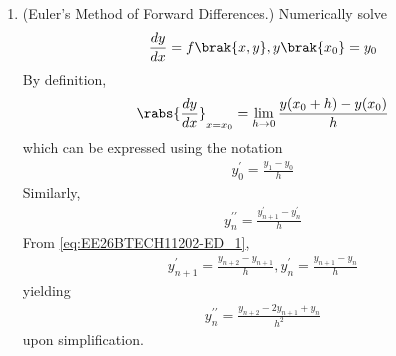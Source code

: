 \begin{enumerate}[label=\thesubsection.\arabic*, ref=\thesubsection.\theenumi]
\begin{align}
\end{align}
in \eqref{eq:EE26BTECH11202-Laplace_5-diff-1},
\begin{align}
	Y(s)&=\frac{s\beta + \gamma}{s^2 + \alpha^2}
\\
	    &=\frac{s\beta}{s^2 + \alpha^2}+\frac{\gamma}{s^2 + \alpha^2}
\end{align}
yielding
\begin{align}
	y(t)=\beta \cos(\alpha t) + \frac{\gamma}{\alpha}\sin(\alpha t) \label{eq:EE26BTECH11202-Laplace_7}
\end{align}
from \eqref{eq:EE26BTECH11202-Laplace_5}.
\item (Euler's Method of Forward Differences.)  Numerically solve 
\begin{align}
	\frac{dy}{dx}=f\brak{x,y}, y\brak{x_0}=y_0
\end{align}
\solution By definition,
\begin{align}
	\rabs{\frac{dy}{dx}}_{x = x_0}= \lim_{h \to 0}\frac{y(x_0+h)-y(x_0)}{h}
\end{align}
which can be expressed using the notation
\begin{align}
	y^{\prime}_0=\frac{y_{1}-y_0}{h} 
	\label{eq:EE26BTECH11202-ED_1}
\end{align}
Similarly,
\begin{align}
	y_n^{\prime \prime}=\frac{y_{n+1}^{\prime}-y_n^{\prime}}{h}
\end{align}
		From \eqref{eq:EE26BTECH11202-ED_1}, 
		\begin{align}
			y_{n+1}^{\prime}=\frac{y_{n+2}-y_{n+1}}{h}, y_n^{\prime}=\frac{y_{n+1}-y_n}{h}
		\end{align}
		yielding
\begin{align}
	y_n^{\prime \prime}=\frac{y_{n+2}-2y_{n+1}+y_n}{h^2} \label{eq:EE26BTECH11202-ED_2}
\end{align}
upon simplification.


\end{enumerate}

